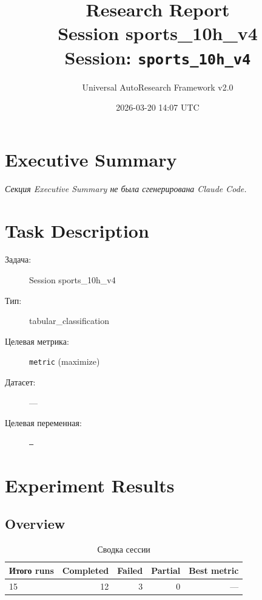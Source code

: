 \documentclass[12pt,a4paper]{article}
\title{
    \Large\textbf{Research Report}\\[0.5em]
    \large Session sports\_10h\_v4\\[0.3em]
    \normalsize Session: \texttt{sports\_10h\_v4}
}
\author{Universal AutoResearch Framework v2.0}
\date{2026-03-20 14:07 UTC}
\begin{document}
\maketitle
\tableofcontents
\newpage


\section{Executive Summary}

\textit{Секция Executive Summary не была сгенерирована Claude Code.}



\section{Task Description}

\begin{description}
    \item[Задача:] Session sports\_10h\_v4
    \item[Тип:] tabular\_classification
    \item[Целевая метрика:] \texttt{metric}
        (maximize)
    \item[Датасет:] ---
    \item[Целевая переменная:] \texttt{---}
\end{description}




\section{Experiment Results}

\subsection{Overview}

\begin{table}[H]
\centering
\caption{Сводка сессии}
\begin{tabular}{lrrrr}
\toprule
Итого runs & Completed & Failed & Partial & Best metric \\
\midrule
15 & \textcolor{passcolor}{12}
    & \textcolor{failcolor}{3}
    & \textcolor{partialcolor}{0}
    & --- \\
\bottomrule
\end{tabular}
\end{table}
\end{document}
